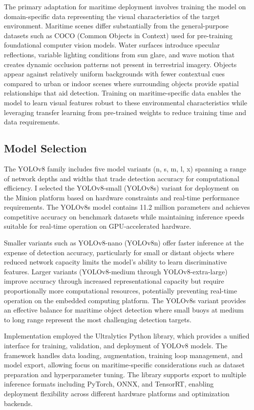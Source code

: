 \documentclass{erauthesis}
\begin{document}
The primary adaptation for maritime deployment involves training the model on domain-specific data representing the visual characteristics of the target environment.
Maritime scenes differ substantially from the general-purpose datasets such as COCO (Common Objects in Context) used for pre-training foundational computer vision models.
Water surfaces introduce specular reflections, variable lighting conditions from sun glare, and wave motion that creates dynamic occlusion patterns not present in terrestrial imagery.
Objects appear against relatively uniform backgrounds with fewer contextual cues compared to urban or indoor scenes where surrounding objects provide spatial relationships that aid detection.
Training on maritime-specific data enables the model to learn visual features robust to these environmental characteristics while leveraging transfer learning from pre-trained weights to reduce training time and data requirements.

\subsection{Model Selection} \label{sec:yolo_model_selection}

The YOLOv8 family includes five model variants (n, s, m, l, x) spanning a range of network depths and widths that trade detection accuracy for computational efficiency.
I selected the YOLOv8-small (YOLOv8s) variant for deployment on the Minion platform based on hardware constraints and real-time performance requirements.
The YOLOv8s model contains 11.2 million parameters and achieves competitive accuracy on benchmark datasets while maintaining inference speeds suitable for real-time operation on GPU-accelerated hardware.

Smaller variants such as YOLOv8-nano (YOLOv8n) offer faster inference at the expense of detection accuracy, particularly for small or distant objects where reduced network capacity limits the model's ability to learn discriminative features.
Larger variants (YOLOv8-medium through YOLOv8-extra-large) improve accuracy through increased representational capacity but require proportionally more computational resources, potentially preventing real-time operation on the embedded computing platform.
The YOLOv8s variant provides an effective balance for maritime object detection where small buoys at medium to long range represent the most challenging detection targets.

Implementation employed the Ultralytics Python library, which provides a unified interface for training, validation, and deployment of YOLOv8 models.
The framework handles data loading, augmentation, training loop management, and model export, allowing focus on maritime-specific considerations such as dataset preparation and hyperparameter tuning.
The library supports export to multiple inference formats including PyTorch, ONNX, and TensorRT, enabling deployment flexibility across different hardware platforms and optimization backends.
\end{document}
